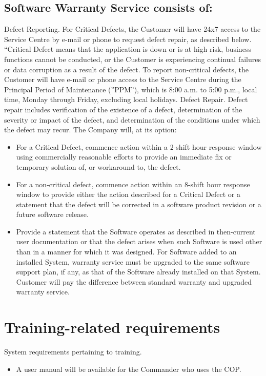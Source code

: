 \subsection{Software Warranty Service consists of:}
Defect Reporting. For Critical Defects, the Customer will have 24x7 access to the Service Centre by e-mail or phone to request defect repair, as described below. “Critical Defect means that the
application is down or is at high risk, business functions cannot be conducted, or the Customer is experiencing continual failures or data corruption as a result of the defect. To report non-critical
defects, the Customer will have e-mail or phone access to the Service Centre during the Principal Period of Maintenance (”PPM”), which is 8:00 a.m. to 5:00 p.m., local time, Monday through Friday,
excluding local holidays. Defect Repair. Defect repair includes verification of the existence of a defect, determination of the
severity or impact of the defect, and determination of the conditions under which the defect may recur. 
The Company will, at its option: 
\begin{itemize}
\item For a Critical Defect, commence action within a 2-shift hour response window using commercially reasonable efforts to provide an immediate fix or temporary solution of, or workaround
to, the defect.
\item For a non-critical defect, commence action within an 8-shift hour response window to provide either the action described for a Critical Defect or a statement that the defect will be corrected
in a software product revision or a future software release.
\item Provide a statement that the Software operates as described in then-current user documentation or that the defect arises when such Software is used other than in a manner for which it
was designed. For Software added to an installed System, warranty service must be upgraded to the same software support plan, if any, as that of the Software already installed on that
System. Customer will pay the difference between standard warranty and upgraded warranty
service.
\end{itemize}


\section{Training-related requirements}
System requirements pertaining to training.

\begin{itemize}
	\item A user manual will be available for the Commander who uses the COP. 	
\end{itemize}


